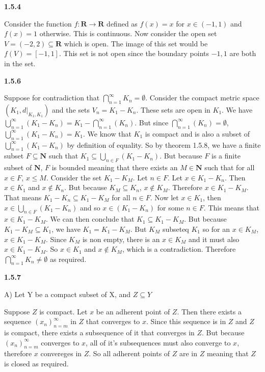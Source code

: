 \documentclass[12pt]{article}
\begin{document}
\textbf{1.5.4}

 Consider the function $f:\textbf{R}\to \textbf{R}$ defined as $f(x) = x$ for $x\in (-1,1)$ and $f(x) = 1$ otherwise. This is continuous. Now consider the open set $V=(-2,2)\subseteq \textbf{R}$ which is open. The image of this set would be $f(V) = [-1,1]$. This set is not open since the boundary points $-1,1$ are both in the set. 

\textbf{1.5.6}

Suppose for contradiction that $ \bigcap^\infty_{n=1}K_n=\emptyset$. Consider the compact metric space $(K_1,d|_{K_1,K_1})$ and the sets $V_n = K_1-K_n$. These sets are open in $K_1$. We have $\bigcup^\infty_{n=1}(K_1-K_n) = K_1 -\bigcap^\infty_{n=1}(K_n)$. But since $\bigcap^\infty_{n=1}(K_n)=\emptyset$, $\bigcup^\infty_{n=1}(K_1-K_n) = K_1$. We know that $K_1$ is compact and is also a subset of $\bigcup^\infty_{n=1}(K_1-K_n)$ by definition of equality. So by theorem 1.5.8, we have a finite subset $F\subseteq\textbf{N}$ such that $K_1 \subseteq \bigcup_{n\in F}(K_1-K_n)$. But because $F$ is a finite subset of $\textbf{N}$, $F$ is bounded meaning that there exists an $M\in \textbf{N}$ such that for all $x\in F$, $x\leq M$. Consider the set $K_1-K_M$. Let $n\in F$. Let $x\in K_1-K_n$. Then $x\in K_1$ and $x\notin K_n$. But because $K_M\subseteq K_n$, $x\notin K_M$. Therefore $x\in K_1-K_M$. That means $K_1-K_n\subseteq K_1-K_M$ for all $n\in F$. Now let $x\in K_1$, then $x\in \bigcup_{n\in F}(K_1-K_n)$ and so $x\in (K_1-K_n)$ for some $n\in F$. This means that $x\in K_1-K_M $. We can then conclude that $K_1\subseteq K_1-K_M$. But because $K_1-K_M\subseteq K_1$, we have $K_1 = K_1-K_M$. But $K_M$ subseteq $K_1$ so for an $x\in K_M$, $x\in K_1-K_M$. Since $K_M$ is non empty, there is an $x\in K_M$ and it must also $x\in K_1-K_M$. So $x\in K_1$ and $x\notin K_M$, which is a contradiction. Therefore $\bigcap^\infty_{n=1}K_n\neq\emptyset$ as required. 

\textbf{1.5.7}

A) Let Y be a compact subset of X, and $Z\subseteq Y$

Suppose $Z$ is compact. Let $x$ be an adherent point of $Z$. Then there exists a sequence $(x_n)^\infty_{n=m}$ in $Z$ that converges to $x$. Since this sequence is in $Z$ and $Z$ is compact, there exists a subsequence of it that converges in $Z$. But because $(x_n)^\infty_{n=m}$ converges to $x$, all of it's subsequences must also converge to $x$, therefore $x$ convereges in $Z$. So all adherent points of $Z$ are in $Z$ meaning that $Z$ is closed as required. 
\end{document}
